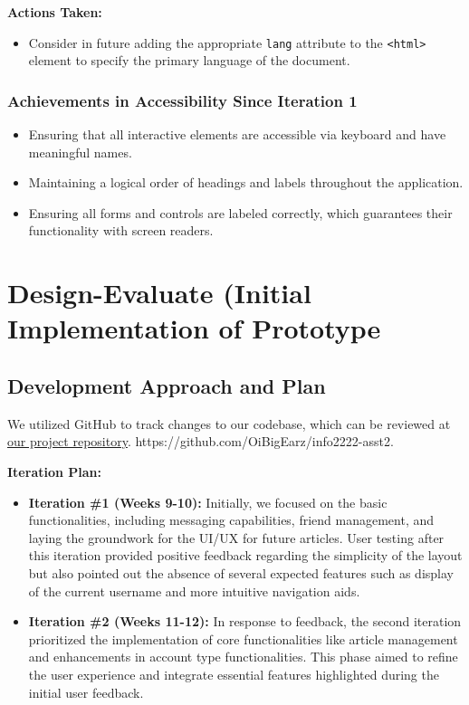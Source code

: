 \documentclass[12pt,a4paper]{article}
\begin{document}
\textbf{Actions Taken:}
\begin{itemize}
    \item Consider in future adding the appropriate \texttt{lang} attribute to the \texttt{<html>} element to specify the primary language of the document.
\end{itemize}


\subsubsection{Achievements in Accessibility Since Iteration 1}

\begin{itemize}
    \item Ensuring that all interactive elements are accessible via keyboard and have meaningful names.
    \item Maintaining a logical order of headings and labels throughout the application.
    \item Ensuring all forms and controls are labeled correctly, which guarantees their functionality with screen readers.
\end{itemize}


\section{Design-Evaluate (Initial Implementation of Prototype}

\subsection*{Development Approach and Plan}
We utilized GitHub to track changes to our codebase, which can be reviewed at \href{https://github.com/OiBigEarz/info2222-asst2}{our project repository}. https://github.com/OiBigEarz/info2222-asst2. 

\textbf{Iteration Plan:}
\begin{itemize}
    \item \textbf{Iteration \#1 (Weeks 9-10):} Initially, we focused on the basic functionalities, including messaging capabilities, friend management, and laying the groundwork for the UI/UX for future articles. User testing after this iteration provided positive feedback regarding the simplicity of the layout but also pointed out the absence of several expected features such as display of the current username and more intuitive navigation aids.
    \item \textbf{Iteration \#2 (Weeks 11-12):} In response to feedback, the second iteration prioritized the implementation of core functionalities like article management and enhancements in account type functionalities. This phase aimed to refine the user experience and integrate essential features highlighted during the initial user feedback.
\end{itemize}
\end{document}
